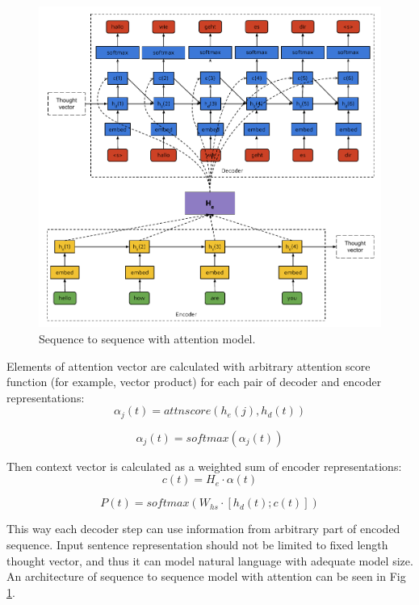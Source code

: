 \begin{figure}
\centering
\includegraphics{Figures/seq2seq}
\decoRule
\caption[Sequence to sequence model]{Sequence to sequence with attention model.}
\label{fig:seq2seq}
\end{figure}

Elements of attention vector are calculated with arbitrary attention score function (for example, vector product) for each pair of decoder and encoder representations:
\begin{equation}
\alpha_j(t) = attnscore(h_e(j), h_d(t))
\label{attn:alpha}
\end{equation}

\begin{equation}
\alpha_j(t) = softmax(\alpha_j(t))
\label{attn:alpha2}
\end{equation}

Then context vector is calculated as a weighted sum of encoder representations:
\begin{equation}
	c(t) = H_e\cdot\alpha(t)
	\label{attn:c}
\end{equation}

\begin{equation}
	P(t) = softmax(W_{hs}\cdot[h_d(t);c(t)])
\label{attn:P}
\end{equation}

This way each decoder step can use information from arbitrary part of encoded sequence. Input sentence representation should not be limited to fixed length thought vector, and thus it can model natural language with adequate model size. An architecture of sequence to sequence model with attention can be seen in Fig \ref{fig:seq2seq}.

